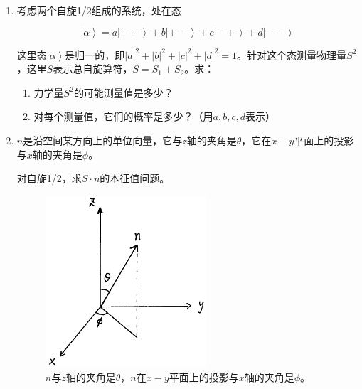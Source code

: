 \begin{enumerate}

\item

考虑两个自旋1/2组成的系统，处在态

\begin{equation*}
\left| \alpha \right\rangle = a \left| ++ \right\rangle + b \left| +- \right\rangle + c \left| -+ \right\rangle  + d \left| -- \right\rangle
\end{equation*}

这里态$\left| \alpha \right\rangle $是归一的，即$|a|^2 + |b|^2 + |c|^2 + |d|^2 = 1$。针对这个态测量物理量$S^2$，这里$S$表示总自旋算符，$S = S_1 + S_2$。求：

\begin{enumerate}
\item 

力学量$S^2$的可能测量值是多少？

\item

对每个测量值，它们的概率是多少？（用$a, b, c, d$表示）

\end{enumerate}

\item

$n$是沿空间某方向上的单位向量，它与$z$轴的夹角是$\theta$，它在$x-y$平面上的投影与$x$轴的夹角是$\phi$。

对自旋1/2，求$S \cdot n$的本征值问题。

\begin{figure}[htbp]
\begin{center}
\includegraphics[width=6cm]{DiracNotation/sigma_n.png}
\caption{$n$与$z$轴的夹角是$\theta$，$n$在$x-y$平面上的投影与$x$轴的夹角是$\phi$。}
\end{center}
\end{figure}


\end{enumerate}





